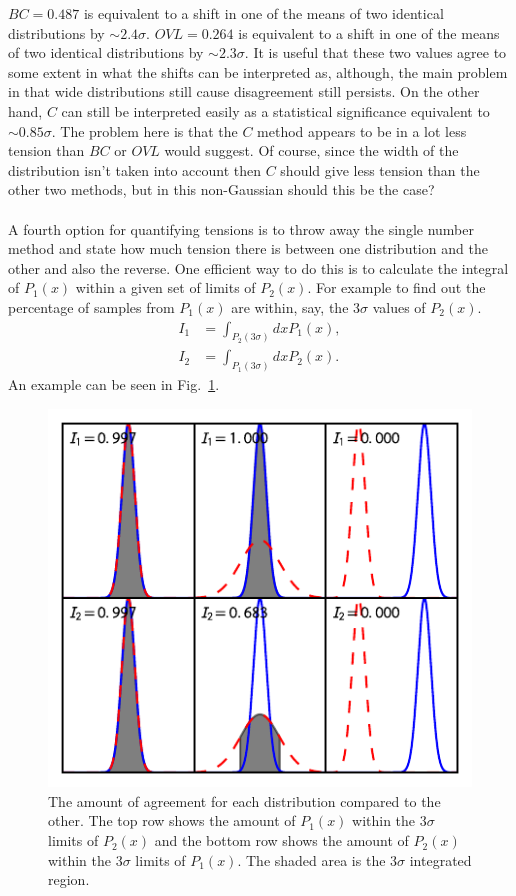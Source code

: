 \documentclass[twocolumn]{revtex4-1}
\begin{document}
    $BC=0.487$ is equivalent to a shift in one of the means of two identical distributions by $\sim2.4\sigma$.
    $OVL=0.264$ is equivalent to a shift in one of the means of two identical distributions by $\sim2.3\sigma$.
    It is useful that these two values agree to some extent in what the shifts can be interpreted as, although, the main problem in that wide distributions still cause disagreement still persists.
    On the other hand, $C$ can still be interpreted easily as a statistical significance equivalent to $\sim0.85\sigma$.
    The problem here is that the $C$ method appears to be in a lot less tension than $BC$ or $OVL$ would suggest.
    Of course, since the width of the distribution isn't taken into account then $C$ should give less tension than the other two methods, but in this non-Gaussian should this be the case?
    \\
    \\
    A fourth option for quantifying tensions is to throw away the single number method and state how much tension there is between one distribution and the other and also the reverse.
    One efficient way to do this is to calculate the integral of $P_1(x)$ within a given set of limits of $P_2(x)$.
    For example to find out the percentage of samples from $P_1(x)$ are within, say, the 3$\sigma$ values of $P_2(x)$.
    \begin{eqnarray}
        I_1 & = \displaystyle\int_{P_2(3\sigma)}dx P_1(x),\\
        I_2 & = \displaystyle\int_{P_1(3\sigma)}dx P_2(x).
    \end{eqnarray}
    An example can be seen in Fig.~\ref{fig:under}.
    \begin{figure}
        \centering
        \includegraphics{../comparison/plots/under.pdf}
        \caption{The amount of agreement for each distribution compared to the other. 
                 The top row shows the amount of $P_1(x)$ within the 3$\sigma$ limits of $P_2(x)$ and the bottom row shows the amount of $P_2(x)$ within the 3$\sigma$ limits of $P_1(x)$. 
                 The shaded area is the 3$\sigma$ integrated region.}
        \label{fig:under}
    \end{figure}  
\end{document}
